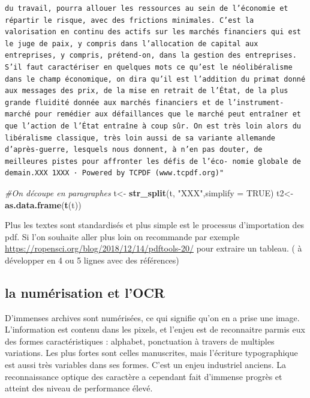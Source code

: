 \documentclass[
]{book}
\newenvironment{Shaded}{\begin{snugshade}}{\end{snugshade}}
\newcommand{\CommentTok}[1]{\textcolor[rgb]{0.56,0.35,0.01}{\textit{#1}}}
\newcommand{\DataTypeTok}[1]{\textcolor[rgb]{0.13,0.29,0.53}{#1}}
\newcommand{\KeywordTok}[1]{\textcolor[rgb]{0.13,0.29,0.53}{\textbf{#1}}}
\newcommand{\NormalTok}[1]{#1}
\newcommand{\OtherTok}[1]{\textcolor[rgb]{0.56,0.35,0.01}{#1}}
\newcommand{\StringTok}[1]{\textcolor[rgb]{0.31,0.60,0.02}{#1}}
\begin{document}
\begin{verbatim}
du travail, pourra allouer les ressources au sein de l’économie et répartir le risque, avec des frictions minimales. C’est la valorisation en continu des actifs sur les marchés financiers qui est le juge de paix, y compris dans l’allocation de capital aux entreprises, y compris, prétend-on, dans la gestion des entreprises. S’il faut caractériser en quelques mots ce qu’est le néolibéralisme dans le champ économique, on dira qu’il est l’addition du primat donné aux messages des prix, de la mise en retrait de l’État, de la plus grande fluidité donnée aux marchés financiers et de l’instrument-marché pour remédier aux défaillances que le marché peut entraîner et que l’action de l’État entraîne à coup sûr. On est très loin alors du libéralisme classique, très loin aussi de sa variante allemande d’après-guerre, lesquels nous donnent, à n’en pas douter, de meilleures pistes pour affronter les défis de l’éco- nomie globale de demain.XXX 1XXX · Powered by TCPDF (www.tcpdf.org)"
\end{verbatim}

\begin{Shaded}
\begin{Highlighting}[]
\CommentTok{#On découpe en paragraphes}
\NormalTok{t<-}\StringTok{ }\KeywordTok{str_split}\NormalTok{(t, }\StringTok{"XXX"}\NormalTok{,}\DataTypeTok{simplify =} \OtherTok{TRUE}\NormalTok{)}
\NormalTok{t2<-}\KeywordTok{as.data.frame}\NormalTok{(}\KeywordTok{t}\NormalTok{(t))}
\end{Highlighting}
\end{Shaded}

Plus les textes sont standardisés et plus simple est le processus d'importation des pdf. Si l'on souhaite aller plus loin on recommande par exemple \url{https://ropensci.org/blog/2018/12/14/pdftools-20/} pour extraire un tableau. ( à développer en 4 ou 5 lignes avec des références)

\hypertarget{la-numuxe9risation-et-locr}{%
\subsection{la numérisation et l'OCR}\label{la-numuxe9risation-et-locr}}

D'immenses archives sont numérisées, ce qui signifie qu'on en a prise une image. L'information est contenu dans les pixels, et l'enjeu est de reconnaitre parmis eux des formes caractéristiques : alphabet, ponctuation à travers de multiples variations. Les plus fortes sont celles manuscrites, mais l'écriture typographique est aussi très variables dans ses formes. C'est un enjeu industriel anciens. La reconnaissance optique des caractère a cependant fait d'immense progrès et atteint des niveau de performance élevé.
\end{document}
